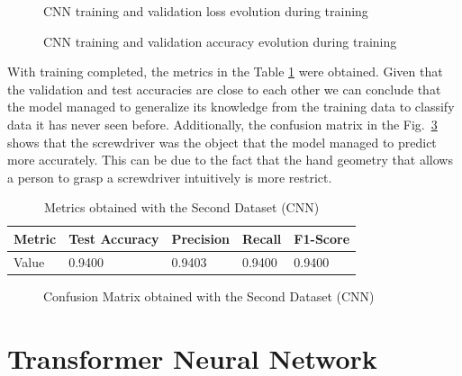 \begin{figure}[H]
    \centering
    {\fontsize{10}{12}\selectfont}
    \caption[CNN training and validation loss evolution during training]{CNN training and validation loss evolution during training}
    \label{fig:cnn_loss}
\end{figure}

\begin{figure}[H]
    \centering
    {\fontsize{10}{12}\selectfont}
    \caption[CNN training and validation accuracy evolution during training]{CNN training and validation accuracy evolution during training}
    \label{fig:cnn_acc}
\end{figure}

With training completed, the metrics in the Table \ref{table:cnn_dataset2_results} were obtained. Given that the validation and test accuracies are close to each other we can conclude that the model managed to generalize its knowledge from the training data to classify data it has never seen before. Additionally, the confusion matrix in the Fig.~\ref{fig:cnn_dataset2_confusion_matrix} shows that the screwdriver was the object that the model managed to predict more accurately. This can be due to the fact that the hand geometry that allows a person to grasp a screwdriver intuitively is more restrict.

\begin{table}[H]
    \centering
    \caption{Metrics obtained with the Second Dataset (CNN)}
    \label{table:cnn_dataset2_results}
    \begin{tabular}{|l|l|l|l|l|}
        \hline
        Metric & Test Accuracy & Precision & Recall & F1-Score \\
        \hline
        Value & 0.9400 & 0.9403 & 0.9400 & 0.9400 \\
        \hline
    \end{tabular}
\end{table}

\begin{figure}[H]
    \centering
    {\fontsize{10}{12}\selectfont}
    \caption[Confusion Matrix obtained with the Second Dataset (CNN)]{Confusion Matrix obtained with the Second Dataset (CNN)}
    \label{fig:cnn_dataset2_confusion_matrix}
\end{figure}

\section{Transformer Neural Network}

